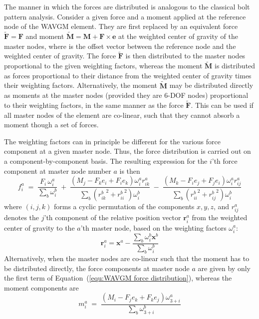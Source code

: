 The manner in which the forces are distributed is analogous to the classical
bolt pattern analysis.
Consider a given force  and a moment applied at the reference node
of the WAVGM element.
They are first replaced by an equivalent force $\widetilde{\bm{F}}=\bm{F}$
and moment $\widetilde{\bm{M}}=\bm{M}+\bm{F}\times\bm{e}$ at the weighted center
of gravity of the master nodes, where  is the offset vector between the
reference node and the weighted center of gravity.
The force $\widetilde{\bm{F}}$ is then distributed to the master nodes
proportional to the given weighting factors, whereas the moment
$\widetilde{\bm{M}}$ is distributed as forces proportional to their distance
from the weighted center of gravity times their weighting factors.
Alternatively, the moment $\widetilde{\bm{M}}$ may be distributed directly as
moments at the master nodes (provided they are 6-DOF nodes) proportional to
their weighting factors, in the same manner as the force $\widetilde{\bm{F}}$.
This can be used if all master nodes of the element are co-linear, such that
they cannot absorb a moment though a set of forces.

The weighting factors can in principle be different for the various force
component at a given master node.
Thus, the force distribution is carried out on a component-by-component basis.
The resulting expression for the $i$'th force component at master
node number $a$ is then
%
\begin{equation}
\label{equ:WAVGM force distribution}
f_i^a \;=\; \frac{F_i\,\omega_i^a}{\sum_b\omega_i^b}
      \;+\; \frac{\left( M_j - F_k e_i + F_i e_k \right) \omega_i^a r_{ik}^a}
                 {\sum_b\left( {r_{ik}^b}^2 + {r_{ii}^b}^2 \right)\omega_i^b}
      \;-\; \frac{\left( M_k - F_i e_j + F_j e_i \right) \omega_i^a r_{ij}^a}
                 {\sum_b\left( {r_{ii}^b}^2 + {r_{ij}^b}^2 \right)\omega_i^b}
\end{equation}
%
where $(i,j,k)$ forms a cyclic permutation of the components $x,y,z$,
and $r_{ij}^a$ denotes the $j$'th component of the relative position vector
$\bm{r}_i^a$ from the weighted center of gravity to the $a$'th master node,
based on the weighting factors $\omega_i^a$:
%
\begin{equation}
\bm{r}_i^a = \bm{x}^a - \frac{\sum_b\omega_i^b \bm{x}^b}{\sum_b\omega_i^b}
\end{equation}
%
Alternatively, when the master nodes are co-linear such that the moment has to
be distributed directly, the force components at master node $a$ are given by
only the first term of Equation~(\ref{equ:WAVGM force distribution}), whereas
the moment components are
%
\begin{equation}
\label{equ:WAVGM moment distribution}
m_i^a \;=\; \frac{\left( M_i - F_j e_k + F_k e_j \right) \omega_{3+i}^a}
                 {\sum_b\omega_{3+i}^b}
\end{equation}


